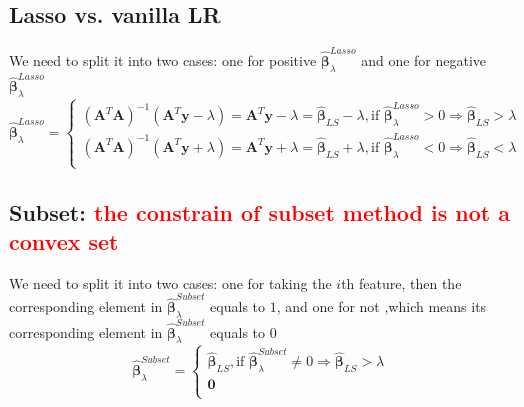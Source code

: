 \documentclass[11pt]{article}
\newcommand{\mtx}[1]{\mathbf{#1}}
\newcommand{\vct}[1]{\mathbf{#1}}
\def \mA {\mtx{A}}
\def \vy {\vct{y}}
\begin{document}
\subsection{Lasso vs. vanilla LR}
We need to split it into two cases: one for positive $\hat{\bm{\beta}}_\lambda^{Lasso}$ and one for negative $\hat{\bm{\beta}}_\lambda^{Lasso}$
\begin{equation}
	\hat{\bm{\beta}}_\lambda^{Lasso} = 
	\left\{
		\begin{aligned}
			(\mA^T\mA)^{-1}(\mA^T\vy-\lambda) = \mA^T\vy-\lambda = \hat{\bm{\beta}}_{LS}-\lambda,  
			\text{if } \hat{\bm{\beta}}_\lambda^{Lasso}>0\Rightarrow \hat{\bm{\beta}}_{LS} > \lambda\\
			(\mA^T\mA)^{-1}(\mA^T\vy+\lambda) = \mA^T\vy+\lambda = \hat{\bm{\beta}}_{LS}+\lambda,  
			\text{if } \hat{\bm{\beta}}_\lambda^{Lasso}<0\Rightarrow\hat{\bm{\beta}}_{LS} < \lambda\\
		\end{aligned}
	\right.
\end{equation}
\subsection{Subset: \textcolor{red}{the constrain of subset method is not a convex set}} 

We need to split it into two cases: one for taking the $i$th feature, then the corresponding element in 
$\hat{\bm{\beta}}_\lambda^{Subset}$ equals to $1$,  
and one for not ,which means its corresponding element in $\hat{\bm{\beta}}_\lambda^{Subset}$ equals to $0$
\begin{equation}
	\hat{\bm{\beta}}_\lambda^{Subset} = 
	\left\{
		\begin{aligned}
			\hat{\bm{\beta}}_{LS},\text{if } \hat{\bm{\beta}}_\lambda^{Subset}\neq0\Rightarrow \hat{\bm{\beta}}_{LS} > \lambda\\
			\mtx{0}\\
		\end{aligned}
	\right.
\end{equation}

\vspace{4cm}
\end{document}
